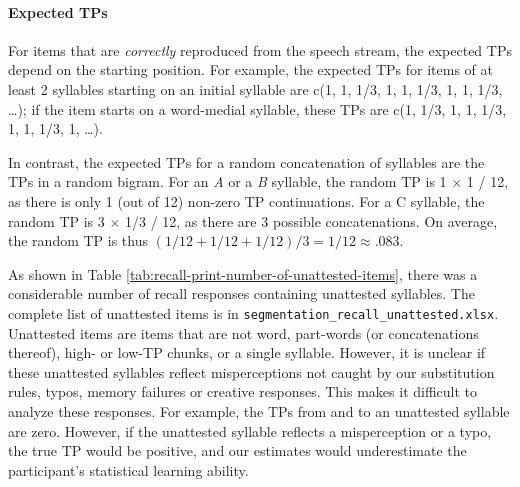 \documentclass[]{article}
\let\oldparagraph\paragraph
\renewcommand{\paragraph}[1]{\oldparagraph{#1}\mbox{}}
\begin{document}
\paragraph{Expected TPs}\label{expected-tps}

For items that are \emph{correctly} reproduced from the speech stream,
the expected TPs depend on the starting position. For example, the
expected TPs for items of at least 2 syllables starting on an initial
syllable are c(1, 1, 1/3, 1, 1, 1/3, 1, 1, 1/3, \ldots{}); if the item
starts on a word-medial syllable, these TPs are c(1, 1/3, 1, 1, 1/3, 1,
1, 1/3, 1, \ldots{}).

In contrast, the expected TPs for a random concatenation of syllables
are the TPs in a random bigram. For an \emph{A} or a \emph{B} syllable,
the random TP is 1 \(\times\) 1 / 12, as there is only 1 (out of 12)
non-zero TP continuations. For a C syllable, the random TP is 3
\(\times\) 1/3 / 12, as there are 3 possible concatenations. On average,
the random TP is thus \((1/12 + 1/12 + 1/12)/ 3 = 1/12 \approx .083\).

\begin{table}[!h]

\caption{\label{tab:recall-print-number-of-unattested-items}Number of unattested items}
\centering
{}
\end{table}

As shown in Table \ref{tab:recall-print-number-of-unattested-items},
there was a considerable number of recall responses containing
unattested syllables. The complete list of unattested items is in
\texttt{segmentation\_recall\_unattested.xlsx}. Unattested items are
items that are not word, part-words (or concatenations thereof), high-
or low-TP chunks, or a single syllable. However, it is unclear if these
unattested syllables reflect misperceptions not caught by our
substitution rules, typos, memory failures or creative responses. This
makes it difficult to analyze these responses. For example, the TPs from
and to an unattested syllable are zero. However, if the unattested
syllable reflects a misperception or a typo, the true TP would be
positive, and our estimates would underestimate the participant's
statistical learning ability.
\end{document}
